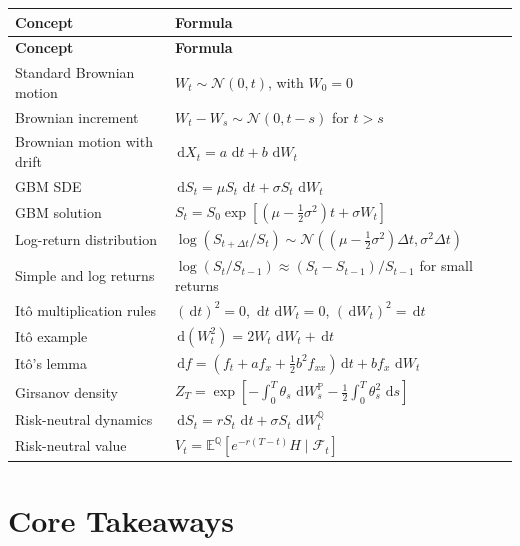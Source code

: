 \documentclass[12pt,openany]{book}
\theoremstyle{definition}
\theoremstyle{remark}
\newcommand{\E}{\mathbb{E}}
\newcommand{\Prob}{\mathbb{P}}
\newcommand{\Fscr}{\mathcal{F}}
\newcommand{\dd}{\,\mathrm{d}}
\begin{document}
\begin{longtable}{@{}L{0.29\textwidth}L{0.64\textwidth}@{}}
\toprule
\textbf{Concept} & \textbf{Formula} \\
\midrule
\endfirsthead
\toprule
\textbf{Concept} & \textbf{Formula} \\
\midrule
\endhead
Standard Brownian motion &
\(W_t\sim\mathcal{N}(0,t)\), with \(W_0=0\) \\
Brownian increment &
\(W_t-W_s\sim\mathcal{N}(0,t-s)\) for \(t>s\) \\
Brownian motion with drift &
\(\dd X_t=a\,\dd t+b\,\dd W_t\) \\
GBM SDE &
\(\dd S_t=\mu S_t\,\dd t+\sigma S_t\,\dd W_t\) \\
GBM solution &
\(S_t=S_0\exp[(\mu-\tfrac12\sigma^2)t+\sigma W_t]\) \\
Log-return distribution &
\(\log(S_{t+\Delta t}/S_t)\sim
\mathcal{N}((\mu-\tfrac12\sigma^2)\Delta t,\sigma^2\Delta t)\) \\
Simple and log returns &
\(\log(S_t/S_{t-1})\approx(S_t-S_{t-1})/S_{t-1}\) for small returns \\
Itô multiplication rules &
\((\dd t)^2=0\), \(\dd t\,\dd W_t=0\), \((\dd W_t)^2=\dd t\) \\
Itô example &
\(\dd(W_t^2)=2W_t\,\dd W_t+\dd t\) \\
Itô's lemma &
\(\dd f=(f_t+af_x+\tfrac12b^2f_{xx})\dd t+bf_x\,\dd W_t\) \\
Girsanov density &
\(Z_T=\exp[-\int_0^T\theta_s\,\dd W_s^{\Prob}
-\tfrac12\int_0^T\theta_s^2\,\dd s]\) \\
Risk-neutral dynamics &
\(\dd S_t=rS_t\,\dd t+\sigma S_t\,\dd W_t^{\mathbb{Q}}\) \\
Risk-neutral value &
\(V_t=\E^{\mathbb{Q}}[e^{-r(T-t)}H\mid\Fscr_t]\) \\
\bottomrule
\end{longtable}

\section{Core Takeaways}
\end{document}
